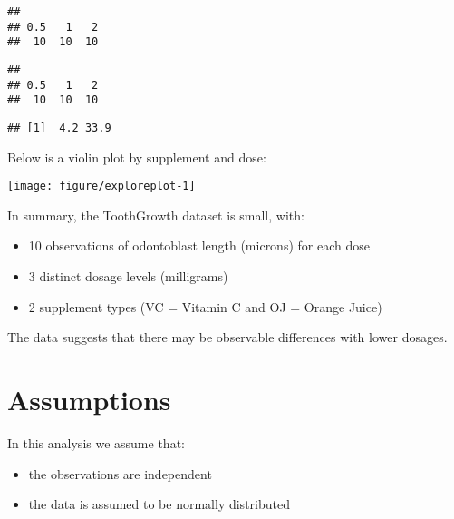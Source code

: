 \documentclass[legalpaper]{article}
\newenvironment{Shaded}{\begin{snugshade}}{\end{snugshade}}
\newcommand{\KeywordTok}[1]{\textcolor[rgb]{0.13,0.29,0.53}{\textbf{{#1}}}}
\newcommand{\StringTok}[1]{\textcolor[rgb]{0.31,0.60,0.02}{{#1}}}
\newcommand{\NormalTok}[1]{{#1}}
\begin{document}
\begin{verbatim}
## 
## 0.5   1   2 
##  10  10  10
\end{verbatim}

\begin{Shaded}
\end{Shaded}

\begin{verbatim}
## 
## 0.5   1   2 
##  10  10  10
\end{verbatim}

\begin{Shaded}
\end{Shaded}

\begin{verbatim}
## [1]  4.2 33.9
\end{verbatim}

Below is a violin plot by supplement and dose:

\begin{center}\texttt{[image: figure/exploreplot-1]} \end{center}

In summary, the ToothGrowth dataset is small, with:

\begin{itemize}
\itemsep1pt\parskip0pt
\item
  10 observations of odontoblast length (microns) for each dose
\item
  3 distinct dosage levels (milligrams)
\item
  2 supplement types (VC = Vitamin C and OJ = Orange Juice)
\end{itemize}

The data suggests that there may be observable differences with lower
dosages.

\section{Assumptions}\label{assumptions}

In this analysis we assume that:

\begin{itemize}
\itemsep1pt\parskip0pt
\item
  the observations are independent
\item
  the data is assumed to be normally distributed
\end{itemize}
\end{document}
